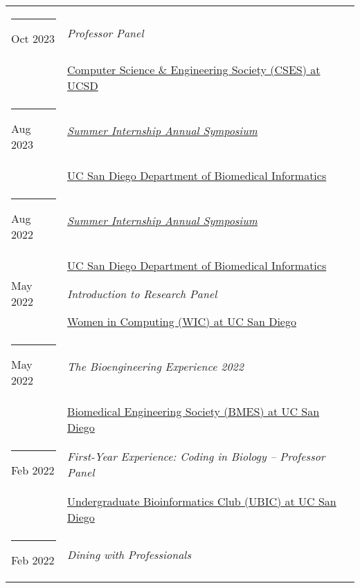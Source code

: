 \documentclass[margin,line]{res}
\begin{document}
\begin{resume}
\begin{longtable}{@{}p{0.7in}p{4in}}
\hspace*{-4mm} \rule{-1mm}{5mm} Oct 2023 & \textit{Professor Panel}\\*
\hspace*{-4mm} & \hspace{4mm} \href{https://csesucsd.com/}{Computer Science \& Engineering Society (CSES) at UCSD}\\
\hspace*{-4mm} \rule{-1mm}{5mm} Aug 2023 & \href{https://dbmi.ucsd.edu/education/internships/index.html}{\textit{Summer Internship Annual Symposium}}\\*
\hspace*{-4mm} & \hspace{4mm} \href{https://dbmi.ucsd.edu/}{UC San Diego Department of Biomedical Informatics}\\
\hspace*{-4mm} \rule{-1mm}{5mm} Aug 2022 & \href{https://dbmi.ucsd.edu/education/internships/index.html}{\textit{Summer Internship Annual Symposium}}\\*
\hspace*{-4mm} & \hspace{4mm} \href{https://dbmi.ucsd.edu/}{UC San Diego Department of Biomedical Informatics}\\
\hspace*{-4mm} May 2022 & \textit{Introduction to Research Panel}\\*
\hspace*{-4mm} & \hspace{4mm} \href{http://wic.ucsd.edu/}{Women in Computing (WIC) at UC San Diego}\\
\hspace*{-4mm} \rule{-1mm}{5mm} May 2022 & \textit{The Bioengineering Experience 2022}\\*
\hspace*{-4mm} & \hspace{4mm} \href{http://bmes.ucsd.edu/}{Biomedical Engineering Society (BMES) at UC San Diego}\\
\hspace*{-4mm} \rule{-1mm}{5mm} Feb 2022 & \textit{First-Year Experience: Coding in Biology -- Professor Panel}\\*
\hspace*{-4mm} & \hspace{4mm} \href{https://ubicucsd.github.io/}{Undergraduate Bioinformatics Club (UBIC) at UC San Diego}\\
\hspace*{-4mm} \rule{-1mm}{5mm} Feb 2022 & \textit{Dining with Professionals}\\*

\end{longtable}
\end{resume}
\end{document}
